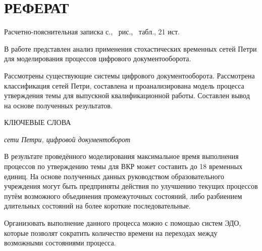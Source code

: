




\linespread{1.25}


%
%

\normalsize

\setcounter{page}{2}

\section*{РЕФЕРАТ}

Расчетно-пояснительная записка \pageref{LastPage} с., \totalfigures\ рис., \totaltables\ табл., 21 ист.

В работе представлен анализ применения стохастических временных сетей Петри для моделирования процессов цифрового документооборота.

Рассмотрены существующие системы цифрового документооборота. Рассмотрена классификация сетей Петри, составлена и проанализирована модель процесса утверждения темы для выпускной квалификационной работы. Составлен вывод на основе полученных результатов.

КЛЮЧЕВЫЕ СЛОВА

\textit{сети Петри, цифровой документоборот}

\pagebreak

\tableofcontents\normalsize



\clearpage


В результате проведённого моделирования максимальное время выполнения процессов по утверждению темы для ВКР может составить до 18 временных единиц. На основе полученных данных руководством образовательного учреждения могут быть предприняты действия по улучшению текущих процессов путём возможного объединения промежуточных состояний, либо разбиением длительных состояний на более короткие последовательные.

Организовать выполнение данного процесса можно с помощью систем ЭДО, которые позволят сократить количество времени на переходах между возможными состояниями процесса.

\clearpage

\addtolength{\oddsidemargin}{-0.25pt}
\begingroup
\renewcommand{\section}[2]{}

   
\endgroup


